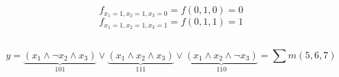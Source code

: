 \documentclass{article}
\begin{document}
\subsection{}
\begin{equation*}
    f_{x_1=1,x_2=1,x_3=0}=f(0,1,0)=0
\end{equation*}
\begin{equation*}
    f_{x_1=1,x_2=1,x_3=1}=f(0,1,1)=1
\end{equation*}
\subsection{}
\begin{equation*}
    y=
    \underbrace{(x_1\land\neg x_2\land x_3)}_{101}\lor
    \underbrace{(x_1\land x_2\land x_3)}_{111}\lor
    \underbrace{(x_1\land x_2\land\neg x_3)}_{110}
    =\sum m(5,6,7)
\end{equation*}
\subsection{}
\subsection{}
\end{document}
